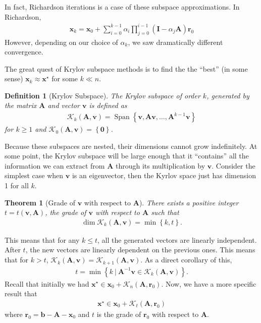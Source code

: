 \documentclass[12pt,a4paper]{article} %
\newtheorem*{theorem}{Theorem}
\newtheorem*{definition}{Definition}
\DeclareMathOperator{\Span}{Span}
\begin{document}
In fact, Richardson iterations is a case of these subspace approximations. In Richardson, 
\begin{align*}
    \bm x_k = \bm x_0 + \sum_{i=0}^{k-1} \alpha_i \prod_{j=0}^{i-1} (\mathbf I - \alpha_j \mathbf A) \bm r_0
\end{align*}
However, depending on our choice of $\alpha_k$, we saw dramatically different convergence.

The great quest of Krylov subspace methods is to find the the ``best'' 
(in some sense)
$\bm x_k \approx \bm x^\star$ for some $k \ll n$.

\begin{definition}[Krylov Subspace]
    The Krylov subspace of order $k$, generated by the matrix $\mathbf A$ and 
    vector $\bm v$ is defined as 
    \begin{align*}
        \mathcal K_k(\mathbf A, \bm v) = \Span \left\{ \bm v, \mathbf A \bm v, 
        \ldots, \mathbf A^{k-1}\bm v\right\}
    \end{align*}
    for $k \ge 1$ and $\mathcal K_0(\mathbf A, \bm v) = \left\{ \bm 0\right\}$.
\end{definition}
Because these subspaces are nested, their dimensions cannot grow indefinitely.
At some point, the Krylov subspace will be large enough that it 
``contains'' all the information we can extract from $\mathbf A$ through its 
multiplication by $\bm v$. Consider the simplest case when $\bm v$ is an eigenvector, 
then the Kyrlov space just has dimension 1 for all $k$.
\begin{theorem}[Grade of $\bm v$ with respect to $\mathbf A$]
    There exists a positive integer $t = t(\bm v, \mathbf A)$, the grade of 
    $\bm v$ with respect to $\mathbf A$ such that 
    \begin{align*}
        \dim \mathcal K_k (\mathbf A, \bm v) = \min \left\{ k, t\right\}.
    \end{align*}
\end{theorem}
This means that for any $k \le t$, all the generated vectors are linearly independent. After 
$t$, the new vectors are linearly dependent on the previous ones. This means that 
for $k > t$, $\mathcal K_k (\mathbf A, \bm v) = \mathcal K_{k+1} (\mathbf A, \bm v)$.
As a direct corollary of this, 
\begin{align*}
    t = \min \left\{ k ~|~ \mathbf A^{-1}\bm v \in \mathcal K_k (\mathbf A, \bm v)\right\}.
\end{align*}
Recall that initially we had 
$\bm x^\star \in \bm x_0 + \mathcal K_n (\mathbf A, \bm r_0)$.
Now, we have a more specific result that 
\begin{align*}
    \bm x^\star \in \bm x_0 + \mathcal K_t (\mathbf A, \bm r_0)
\end{align*}
where $\bm r_0 = \bm b - \mathbf A - \bm x_0$ and $t$ is the grade of 
$\bm r_0$ with respect to $\mathbf A$.
\end{document}
